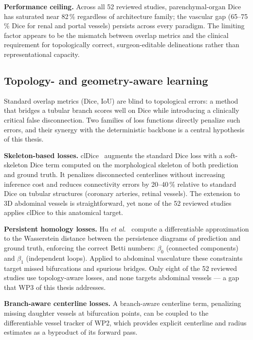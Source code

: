 \documentclass[a4paper,11pt,twoside]{article}
\begin{document}
\textbf{Performance ceiling.}
Across all 52 reviewed studies, parenchymal-organ Dice has saturated near
82\,\% regardless of architecture family; the vascular gap (65--75\,\% Dice
for renal and portal vessels) persists across every paradigm. The limiting
factor appears to be the mismatch between overlap metrics and the clinical
requirement for topologically correct, surgeon-editable delineations rather
than representational capacity.

\subsection{Topology- and geometry-aware learning}

Standard overlap metrics (Dice, IoU) are blind to topological errors: a
method that bridges a tubular branch scores well on Dice while introducing
a clinically critical false disconnection.  Two families of loss functions
directly penalize such errors, and their synergy with the deterministic
backbone is a central hypothesis of this thesis.

\textbf{Skeleton-based losses.}
clDice~\cite{shit2021cldice} augments the standard Dice loss with a
soft-skeleton Dice term computed on the morphological skeleton of both
prediction and ground truth.  It penalizes disconnected centerlines without
increasing inference cost and reduces connectivity errors by 20--40\,\%
relative to standard Dice on tubular structures (coronary arteries, retinal
vessels).  The extension to 3D abdominal vessels is straightforward, yet
none of the 52 reviewed studies applies clDice to this anatomical target.

\textbf{Persistent homology losses.}
Hu \textit{et al.}~\cite{hu2019topology} compute a differentiable
approximation to the Wasserstein distance between the persistence diagrams of
prediction and ground truth, enforcing the correct Betti numbers:
$\beta_0$ (connected components) and $\beta_1$ (independent loops).
Applied to abdominal vasculature these constraints target missed
bifurcations and spurious bridges.  Only eight of the 52 reviewed studies
use topology-aware losses, and none targets abdominal vessels --- a gap that
WP3 of this thesis addresses.

\textbf{Branch-aware centerline losses.}
A branch-aware centerline term, penalizing missing daughter vessels at
bifurcation points, can be coupled to the differentiable vessel tracker of
WP2, which provides explicit centerline and radius estimates as a byproduct
of its forward pass.
\end{document}
